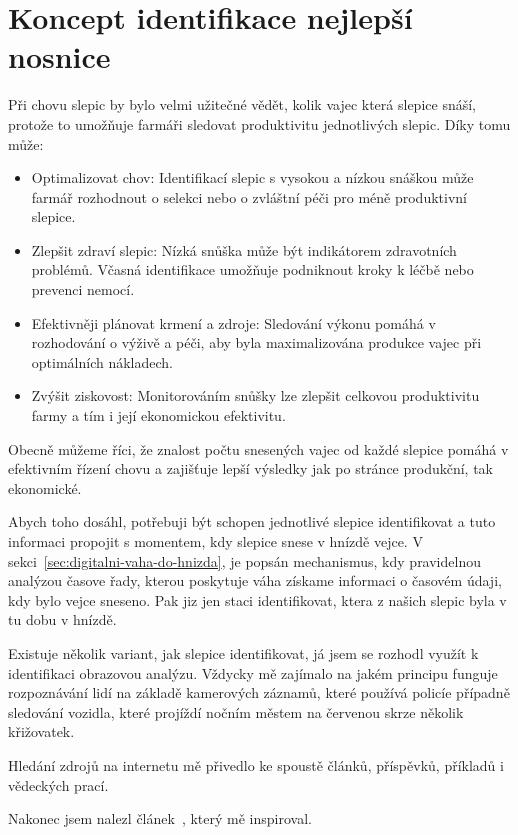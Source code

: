 \section{Koncept identifikace nejlepší nosnice}\label{sec:koncept-identifikace-nejlepsi-nosnice}

Při chovu slepic by bylo velmi užitečné vědět, kolik vajec která slepice snáší, protože to umožňuje farmáři sledovat produktivitu jednotlivých slepic.
Díky tomu může:
\begin{itemize}
    \item Optimalizovat chov: Identifikací slepic s vysokou a nízkou snáškou může farmář rozhodnout o selekci nebo o zvláštní péči pro méně produktivní slepice.
    \item Zlepšit zdraví slepic: Nízká snůška může být indikátorem zdravotních problémů.
    Včasná identifikace umožňuje podniknout kroky k léčbě nebo prevenci nemocí.
    \item Efektivněji plánovat krmení a zdroje: Sledování výkonu pomáhá v rozhodování o výživě a péči, aby byla maximalizována produkce vajec při optimálních nákladech.
    \item Zvýšit ziskovost: Monitorováním snůšky lze zlepšit celkovou produktivitu farmy a tím i její ekonomickou efektivitu.
\end{itemize}

Obecně můžeme říci, že znalost počtu snesených vajec od každé slepice pomáhá v efektivním řízení chovu a zajišťuje lepší výsledky jak po stránce produkční, tak ekonomické.

Abych toho dosáhl, potřebuji být schopen jednotlivé slepice identifikovat a tuto informaci propojit s momentem, kdy slepice snese v hnízdě vejce.
V sekci~\ref{sec:digitalni-vaha-do-hnizda}, je popsán mechanismus, kdy pravidelnou analýzou časove řady, kterou poskytuje váha získame informaci o časovém údaji, kdy bylo vejce sneseno.
Pak jiz jen staci identifikovat, ktera z našich slepic byla v tu dobu v hnízdě.

Existuje několik variant, jak slepice identifikovat, já jsem se rozhodl využít k identifikaci obrazovou analýzu.
Vždycky mě zajímalo na jakém principu funguje rozpoznávání lidí na základě kamerových záznamů, které používá policíe případně sledování vozidla, které projíždí nočním městem na červenou skrze několik křižovatek.

Hledání zdrojů na internetu mě přivedlo ke spoustě článků, příspěvků, příkladů i vědeckých prací.

Nakonec jsem nalezl článek~\cite{medium-person-reidentification}, který mě inspiroval.

